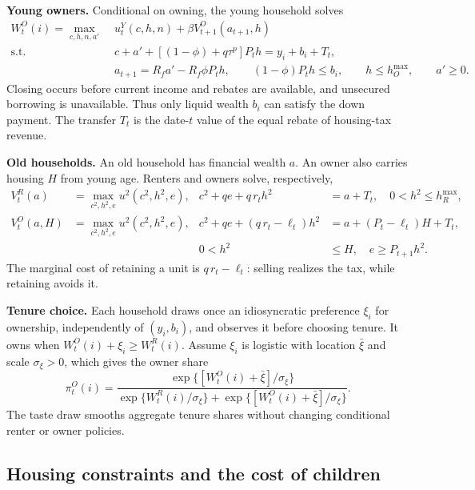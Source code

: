 \textbf{Young owners.}
Conditional on owning, the young household solves
\begin{align}
 W_t^O(i)=\max_{c,h,n,a'}\;&u_t^Y(c,h,n)+\beta V_{t+1}^O(a_{t+1},h) \nonumber\\
 \text{s.t.}\quad&
 c+a'+[(1-\phi)+q\tau^p]P_th=y_i+b_i+T_t,\nonumber\\[-2pt]
 &a_{t+1}=R_fa'-R_f\phi P_th,\qquad
 (1-\phi)P_th\leq b_i,\qquad h\leq h_O^{\max},\qquad a'\geq0.
 \label{eq:olg_young_owner}
\end{align}
Closing occurs before current income and rebates are available, and unsecured
borrowing is unavailable.  Thus only liquid wealth $b_i$ can satisfy the down
payment.  The transfer $T_t$ is the date-$t$ value of the equal rebate of
housing-tax revenue.

\textbf{Old households.}
An old household has financial wealth $a$.  An owner also carries housing $H$
from young age.  Renters and owners solve, respectively,
\begin{align}
 V_t^R(a)&=\max_{c^2,h^2,e}u^2(c^2,h^2,e),
 &c^2+qe+q\,r_th^2&=a+T_t,\quad 0<h^2\leq h_R^{\max},
 \label{eq:olg_old_renter}\\
 V_t^O(a,H)&=\max_{c^2,h^2,e}u^2(c^2,h^2,e),
 &c^2+qe+(q\,r_t-\ell_t)h^2&=a+(P_t-\ell_t)H+T_t,\nonumber\\[-2pt]
 &&0<h^2&\leq H,\quad e\geq P_{t+1}h^2.
 \label{eq:olg_old_owner}
\end{align}
The marginal cost of retaining a unit is $q\,r_t-\ell_t$: selling realizes the
tax, while retaining avoids it.

\textbf{Tenure choice.}
Each household draws once an idiosyncratic preference $\xi_i$ for ownership,
independently of $(y_i,b_i)$, and observes it before choosing tenure.  It owns
when $W_t^O(i)+\xi_i\geq W_t^R(i)$.  Assume $\xi_i$ is logistic with
location $\bar\xi$ and scale $\sigma_\xi>0$, which gives the owner share
\begin{equation}
 \pi_t^O(i)=
 \frac{\exp\{[W_t^O(i)+\bar\xi]/\sigma_\xi\}}
 {\exp\{W_t^R(i)/\sigma_\xi\}+\exp\{[W_t^O(i)+\bar\xi]/\sigma_\xi\}}.
\label{eq:olg_owner_share}
\end{equation}
The taste draw smooths aggregate tenure shares without changing conditional
renter or owner policies.

\subsection{Housing constraints and the cost of children}

